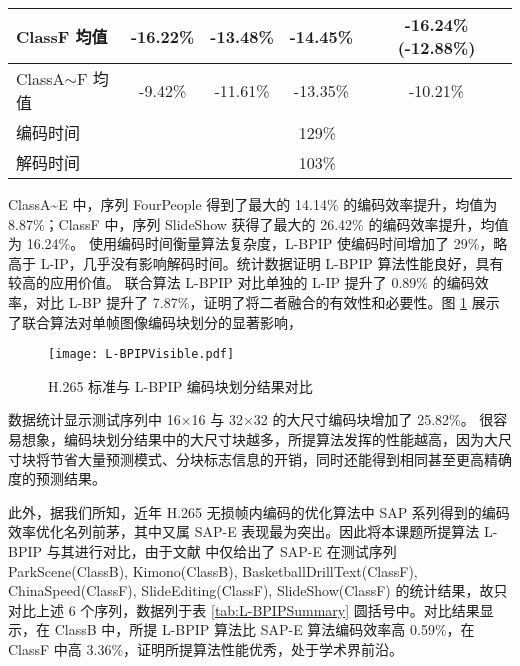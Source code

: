 \begin{table}[!p]
\begin{minipage}{\linewidth}
\begin{tabular}{@{}clcccc@{}}
            \multicolumn{2}{l}{ClassF 均值}        & -16.22\%                                  & -13.48\%                 & -14.45\% & -16.24\% (-12.88\%)                                                                                                                       \\ \midrule
            \multicolumn{2}{l}{ClassA$\sim$F 均值} & -9.42\%                                   & -11.61\%                 & -13.35\% & -10.21\%                                                                                                                                  \\ \midrule
            \multicolumn{2}{l}{编码时间}           & \multicolumn{4}{c}{129\%}                                                                                                                                                                                                   \\ \midrule
            \multicolumn{2}{l}{解码时间}           & \multicolumn{4}{c}{103\%}                                                                                                                                                                                                   \\ \bottomrule
        \end{tabular}
    \end{minipage}
\end{table}
ClassA\textasciitilde E 中，序列 FourPeople 得到了最大的 14.14\% 的编码效率提升，均值为 8.87\%；ClassF 中，序列 SlideShow 获得了最大的 26.42\% 的编码效率提升，均值为 16.24\%。
使用编码时间衡量算法复杂度，L-BPIP 使编码时间增加了 29\%，略高于 L-IP，几乎没有影响解码时间。统计数据证明 L-BPIP 算法性能良好，具有较高的应用价值。
联合算法 L-BPIP 对比单独的 L-IP 提升了 0.89\% 的编码效率，对比 L-BP 提升了 7.87\%，证明了将二者融合的有效性和必要性。图 \ref{fig:L-BPIPVisible} 展示了联合算法对单帧图像编码块划分的显著影响，
\begin{figure}[hbt]
    \centering
    \texttt{[image: L-BPIPVisible.pdf]}
    \caption{H.265 标准与 L-BPIP 编码块划分结果对比}
    \label{fig:L-BPIPVisible}
\end{figure}
数据统计显示测试序列中 16$\times$16 与 32$\times$32 的大尺寸编码块增加了 25.82\%。
很容易想象，编码块划分结果中的大尺寸块越多，所提算法发挥的性能越高，因为大尺寸块将节省大量预测模式、分块标志信息的开销，同时还能得到相同甚至更高精确度的预测结果。

此外，据我们所知，近年 H.265 无损帧内编码的优化算法中 SAP 系列得到的编码效率优化名列前茅，其中又属 SAP-E 表现最为突出。因此将本课题所提算法 L-BPIP 与其进行对比，由于文献 \cite{pwmResidualsPiecewiseMapping} 中仅给出了 SAP-E 在测试序列 ParkScene(ClassB), Kimono(ClassB), BasketballDrillText(ClassF), ChinaSpeed(ClassF), SlideEditing(ClassF), SlideShow(ClassF) 的统计结果，故只对比上述 6 个序列，数据列于表 \ref{tab:L-BPIPSummary} 圆括号中。对比结果显示，在 ClassB 中，所提 L-BPIP 算法比 SAP-E 算法编码效率高 0.59\%，在 ClassF 中高 3.36\%，证明所提算法性能优秀，处于学术界前沿。

